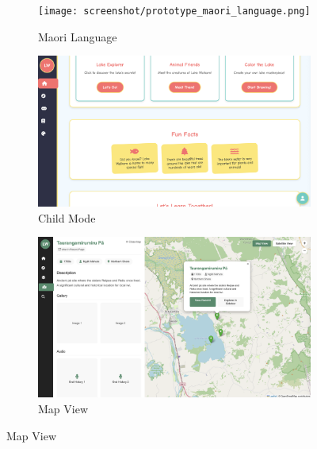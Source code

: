\begin{figure}[H]
  \vspace{0.5cm}

  \begin{subfigure}[b]{0.3\textwidth}
    \texttt{[image: screenshot/prototype\_maori\_language.png]}
    \caption{Maori Language}
  \end{subfigure}\hfill
  \begin{subfigure}[b]{0.3\textwidth}
    \includegraphics[width=\textwidth]{screenshot/prototype_childmode.png}
    \caption{Child Mode}
  \end{subfigure}\hfill
  \begin{subfigure}[b]{0.3\textwidth}
    \includegraphics[width=\textwidth]{screenshot/prototype_mapview.png}
    \caption{Map View}
  \end{subfigure}

  \vspace{0.5cm}


\end{figure}
